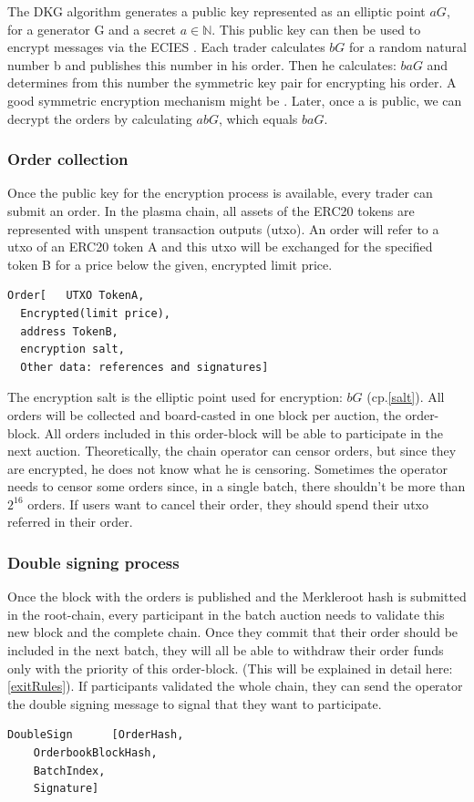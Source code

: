 \documentclass[11pt,parskip=full]{scrartcl}%
\newcommand*{\erc}{ERC20 }
\begin{document}
The DKG algorithm generates a public key represented as an elliptic point $aG\label{public key}$, for a generator G and a secret $a\in \mathbb{N}$.
This public key can then be used to encrypt messages via the ECIES \cite{ECIES}.
Each trader calculates $bG \label{salt}$ for a random natural number b and publishes this number in his order.
Then he calculates: $baG$ and determines from this number the symmetric key pair for encrypting his order.
A good symmetric encryption mechanism might be \cite{cipher}.
Later, once a is public, we can decrypt the orders by calculating $abG$, which equals $baG$.


\subsubsection{Order collection}
\label{orderblock}
Once the public key for the encryption process is available, every trader can submit an order.
In the plasma chain, all assets of the ERC20 tokens are represented with unspent transaction outputs (utxo).
An order will refer to a utxo of an \erc token A and this utxo will be exchanged for the specified token B for a price below the given, encrypted limit price.
\begin{lstlisting}
Order[   UTXO TokenA,
  Encrypted(limit price),
  address TokenB,
  encryption salt,
  Other data: references and signatures]
\end{lstlisting} 
The encryption salt is the elliptic point used for encryption:  $bG$ (cp.\ref{salt}).
All orders will be collected and board-casted in one block per auction, the order-block.
All orders included in this order-block will be able to participate in the next auction.
Theoretically, the chain operator can censor orders, but since they are encrypted, he does not know what he is censoring.
Sometimes the operator needs to censor some orders since, in a single batch, there shouldn't be more than $2^{16}$ orders.
If users want to cancel their order, they should spend their utxo referred in their order.

\subsubsection{Double signing process}
Once the block with the orders is published and the Merkleroot hash is submitted in the root-chain, every participant in the batch auction needs to validate this new block and the complete chain.
Once they commit that their order should be included in the next batch, they will all be able to withdraw their order funds only with the priority of this order-block.
(This will be explained in detail here: \ref{exitRules}).
If participants validated the whole chain, they can send the operator the double signing message to signal that they want to participate.
\begin{lstlisting}
DoubleSign      [OrderHash,
    OrderbookBlockHash,
    BatchIndex,
    Signature]
\end{lstlisting}
\end{document}
